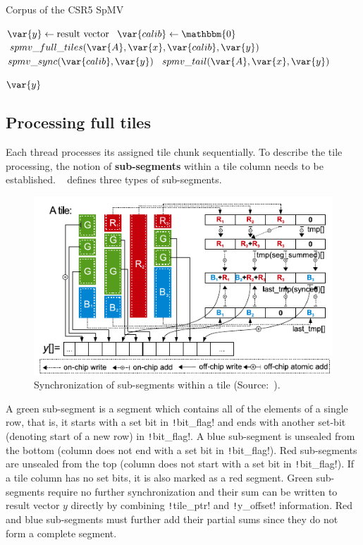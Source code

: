 \documentclass[thesis=M,english]{FITthesis}[2019/12/23]
\newcommand{\csre}[1]{\texttt!#1!}
\begin{document}
\begin{algorithm}[h]
    \caption{Corpus of the CSR5 SpMV}
    \begin{algorithmic}
        \State \(\var{y} \gets \text{result vector}\)
        \State \(\var{calib} \gets \mathbbm{0}\)
        \State \(spmv\_full\_tiles(\var{A}, \var{x}, \var{calib}, \var{y})\)
        \State \(spmv\_sync(\var{calib}, \var{y})\)
        \State \(spmv\_tail(\var{A}, \var{x}, \var{y})\)

        \Return $\var{y}$
        \EndFunction
    \end{algorithmic}
\end{algorithm}

\subsection{Processing full tiles}

Each thread processes its assigned tile chunk sequentially.
To describe the tile processing, the notion of \textbf{sub-segments} within a tile column needs
to be established.
~\cite{liu2015csr5} defines three types of sub-segments.


\begin{figure}[htp]
    \centering
    \includegraphics[scale=1]{static/A_secs.pdf}
    \caption{Synchronization of sub-segments within a tile (Source:~\cite{liu2015csr5}).}\label{csr5:tileSync}
\end{figure}

A green sub-segment is a segment which contains
all of the elements of a single row, that is, it starts with a set bit in \csre{bit_flag} and ends with
another set-bit (denoting start of a new row) in \csre{bit_flag}. A blue sub-segment is unsealed from
the bottom (column does not end with a set bit in \csre{bit_flag}).
Red sub-segments are unsealed from the top (column does not start with a set bit in \csre{bit_flag}).
If a tile column has no set bits, it is also marked as a red segment.
Green sub-segments require no further synchronization and their sum can be written to result vector \(y\)
directly by combining \csre{tile_ptr} and \csre{y_offset} information. Red and blue sub-segments must
further add their partial sums since they do not form a complete segment.
\end{document}
